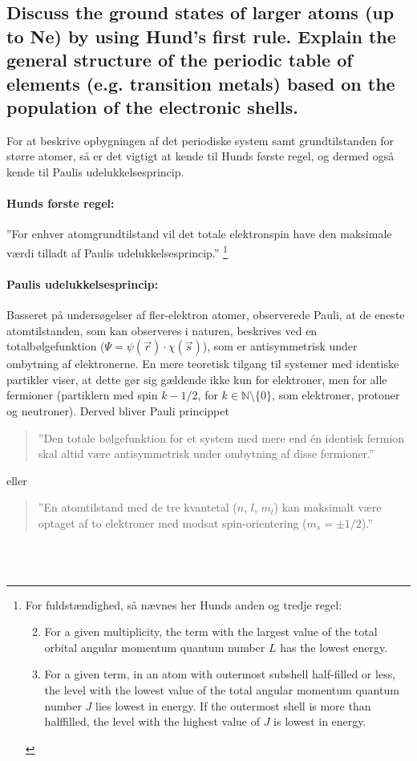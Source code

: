 \subsection{Discuss the ground states of larger atoms (up to Ne) by using Hund's first rule. Explain the general structure of the periodic table of elements (e.g. transition metals) based on the population of the electronic shells.}


For at beskrive opbygningen af det periodiske system samt grundtilstanden for større atomer, så er det vigtigt at kende til Hunds første regel, og dermed også kende til Paulis udelukkelsesprincip.

\paragraph{Hunds første regel:} ''For enhver atomgrundtilstand vil det totale elektronspin have den maksimale værdi tilladt af Paulis udelukkelsesprincip.'' \footnote{For fuldstændighed, så nævnes her Hunds anden og tredje regel:
\begin{enumerate}
    \setcounter{enumi}{1}
    \item For a given multiplicity, the term with the largest value of the total orbital angular momentum quantum number $L$ has the lowest energy.
    \item For a given term, in an atom with outermost subshell half-filled or less, the level with the lowest value of the total angular momentum quantum number $J$ lies lowest in energy. If the outermost shell is more than halffilled, the level with the highest value of $J$ is lowest in energy.
\end{enumerate}
}

\paragraph{Paulis udelukkelsesprincip:} Basseret på undersøgelser af fler-elektron atomer, observerede Pauli, at de eneste atomtilstanden, som kan observeres i naturen, beskrives ved en totalbølgefunktion ($\Psi = \psi(\Vec{r})\cdot\chi(\Vec{s})$), som er antisymmetrisk under ombytning af elektronerne. En mere teoretisk tilgang til systemer med identiske partikler viser, at dette gør sig gældende ikke kun for elektroner, men for alle fermioner (partiklern med spin $k - 1/2$, for $k\in\mathbb{N}\setminus\{0\}$, som elektroner, protoner og neutroner). Derved bliver Pauli princippet
\begin{quote}
    ''Den totale bølgefunktion for et system med mere end én identisk fermion skal altid være antisymmetrisk under ombytning af disse fermioner.''
\end{quote}
eller
\begin{quote}
    ''En atomtilstand med de tre kvantetal ($n$, $l$, $m_l$) kan maksimalt være optaget af to elektroner med modsat spin-orientering ($m_s = \pm 1/2$).''
\end{quote}
$ $\\\\

